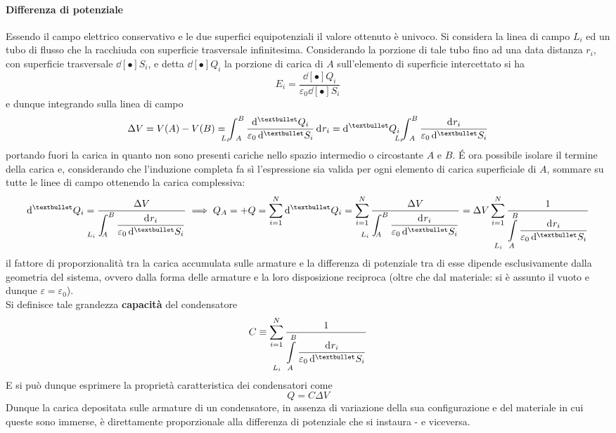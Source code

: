 \paragraph{Differenza di potenziale} Essendo il campo elettrico conservativo e le due superfici equipotenziali il valore ottenuto è univoco. Si considera la linea di campo $L_i$ ed un tubo di flusso che la racchiuda con superficie trasversale infinitesima. Considerando la porzione di tale tubo fino ad una data distanza $r_i$, con superficie trasversale $\dd[•]{S_i}$, e detta $\dd[•]{Q_i}$ la porzione di carica di $A$ sull'elemento di superficie intercettato si ha
\[E_i = \frac{\dd[•]{Q_i}}{\varepsilon_0 \dd[•]{S_i}}\]
e dunque integrando sulla linea di campo
\[\Delta V = V(A) - V(B) = \int_{\hspace{-0.45cm} L_i \hspace{0.22cm} A}^B \frac{\dd[•]{Q_i}}{\varepsilon_0 \dd[•]{S_i}} \dd[]{r_i} = \dd[•]{Q_i} \int_{\hspace{-0.45cm} L_i \hspace{0.22cm} A}^B \frac{ \dd[]{r_i}}{\varepsilon_0 \dd[•]{S_i}}\]
portando fuori la carica in quanto non sono presenti cariche nello spazio intermedio o circostante $A$ e $B$. \'E ora possibile isolare il termine della carica e, considerando che l'induzione completa fa sì l'espressione sia valida per ogni elemento di carica superficiale di $A$, sommare su tutte le linee di campo ottenendo la carica complessiva:
\[\dd[•]{Q_i} = \frac{\Delta V}{\ds \int_{\hspace{-0.6cm} L_i \hspace{0.22cm} A}^B \frac{ \dd[]{r_i}}{\varepsilon_0 \dd[•]{S_i}}} \implies Q_A = +Q = \sum\limits_{i=1}^{N} \dd[•]{Q_i} = \sum\limits_{i=1}^{N} \frac{\Delta V}{\ds \int_{\hspace{-0.6cm} L_i \hspace{0.22cm} A}^B \frac{ \dd[]{r_i}}{\varepsilon_0 \dd[•]{S_i}}} = \Delta V \sum\limits_{i=1}^{N} \frac{1}{\ds \int\limits_{\hspace{-0.45cm} L_i \hspace{0.22cm} A}^B \frac{ \dd[]{r_i}}{\varepsilon_0 \dd[•]{S_i}}}\]
il fattore di proporzionalità tra la carica accumulata sulle armature e la differenza di potenziale tra di esse dipende esclusivamente dalla geometria del sistema, ovvero dalla forma delle armature e la loro disposizione reciproca (oltre che dal materiale: si è assunto il vuoto e dunque $\varepsilon = \varepsilon_0$).
\\Si definisce tale grandezza \textbf{capacità} del condensatore
\[C \equiv \sum\limits_{i=1}^{N} \frac{1}{\ds \int\limits_{\hspace{-0.45cm} L_i \hspace{0.22cm} A}^B \frac{ \dd[]{r_i}}{\varepsilon_0 \dd[•]{S_i}}}\]
E si può dunque esprimere la proprietà caratteristica dei condensatori come
\[Q = C \Delta V \]
Dunque la carica depositata sulle armature di un condensatore, in assenza di variazione della sua configurazione e del materiale in cui queste sono immerse, è direttamente proporzionale alla differenza di potenziale che si instaura - e viceversa.

